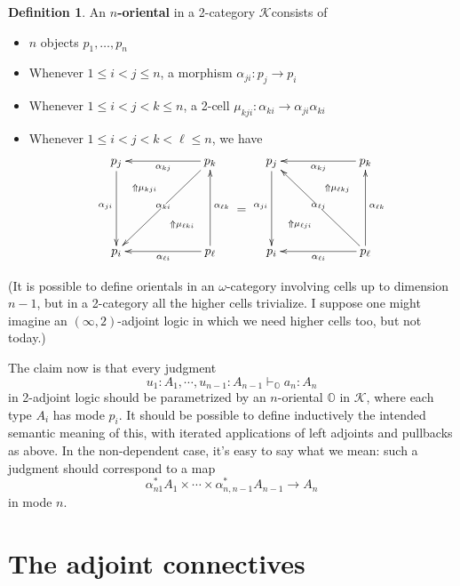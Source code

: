 \documentclass{amsart}
\def\K{\ensuremath{\mathcal{K}}}
\def\O{\ensuremath{\mathbb{O}}}
\theoremstyle{definition}
\newtheorem{defn}{Definition}
\begin{document}
\begin{defn}
  An \textbf{$n$-oriental} in a 2-category \K consists of
  \begin{itemize}
  \item $n$ objects $p_1,\dots, p_n$
  \item Whenever $1\le i<j\le n$, a morphism $\alpha_{ji} : p_j \to p_i$
  \item Whenever $1\le i<j<k\le n$, a 2-cell $\mu_{kji} : \alpha_{ki} \to \alpha_{ji}\alpha_{ki}$
  \item Whenever $1\le i<j<k<\ell\le n$, we have
    \begin{equation*}
      \vcenter{\xymatrix@+3pc{
          p_j \ar[d]_{\alpha_{ji}}
          \ar@{}[dr]|(.3){\Uparrow\mu_{kji}}
          \ar@{}[dr]|(.7){\Uparrow\mu_{\ell ki}}
          &
          p_k\ar[l]^{\alpha_{kj}} \ar[dl]|{\alpha_{ki}}\\
          p_i &
          p_\ell \ar[l]^{\alpha_{\ell i}} \ar[u]_{\alpha_{\ell k}}
        }}
      = 
      \vcenter{\xymatrix@+3pc{
          p_j \ar[d]_{\alpha_{ji}} &
          p_k\ar[l]^{\alpha_{kj}} \\
          p_i
          \ar@{}[ur]|(.3){\Uparrow\mu_{\ell ji}}
          \ar@{}[ur]|(.7){\Uparrow\mu_{\ell kj}}
          &
          p_\ell \ar[l]^{\alpha_{\ell i}} \ar[u]_{\alpha_{\ell k}} \ar[ul]|{\alpha_{\ell j}}
        }}\end{equation*}
  \end{itemize}
\end{defn}

(It is possible to define orientals in an $\omega$-category involving cells up to dimension $n-1$, but in a 2-category all the higher cells trivialize.
I suppose one might imagine an $(\infty,2)$-adjoint logic in which we need higher cells too, but not today.)

The claim now is that every judgment
\[ u_1 : A_1, \cdots, u_{n-1} : A_{n-1} \vdash_{\O} a_{n} : A_{n} \]
in 2-adjoint logic should be parametrized by an $n$-oriental $\O$ in \K, where each type $A_i$ has mode $p_i$.
It should be possible to define inductively the intended semantic meaning of this, with iterated applications of left adjoints and pullbacks as above.
In the non-dependent case, it's easy to say what we mean: such a judgment should correspond to a map
\[ \alpha_{n1}^* A_1 \times \cdots \times \alpha_{n,n-1}^* A_{n-1} \longrightarrow A_n \]
in mode $n$.

\section{The adjoint connectives}
\label{sec:adjoint-connectives}
\end{document}
